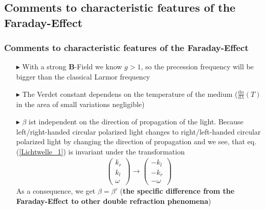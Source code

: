 \documentclass[11pt,a4paper]{beamer}
\begin{document}
\begin{frame}
\subsection{Comments to characteristic features of the Faraday-Effect}
\frametitle{Comments to characteristic features of the Faraday-Effect}
\begin{itemize}
\item[$\blacktriangleright$] With a strong \textbf{B}-Field we know $g > 1$, so the precession frequency will be bigger than the classical Larmor frequency
\item[$\blacktriangleright$] The Verdet constant dependens on the temperature of the medium ($\frac{\text{d} n}{\text{d} \lambda}(T)$ in the area of small variations negligible)
\item[$\blacktriangleright$] $\beta$ ist independent on the direction of propagation of the light.
Because left/right-handed circular polarized light changes to right/left-handed circular polarized light by changing the direction of propagation and
we see, that eq. (\ref{Lichtwelle_1}) is invariant under the transformation 
\begin{align}
\begin{pmatrix}
k_r \\
k_l \\
\omega
\end{pmatrix} \rightarrow 
\begin{pmatrix}
-k_l\\
-k_r\\
-\omega
\end{pmatrix}
\end{align}
As a consequence, we get $\beta = \beta'$ \newline(\textbf{the specific difference from the Faraday-Effect to other double refraction phenomena})
\end{itemize}
\end{frame}
\end{document}
